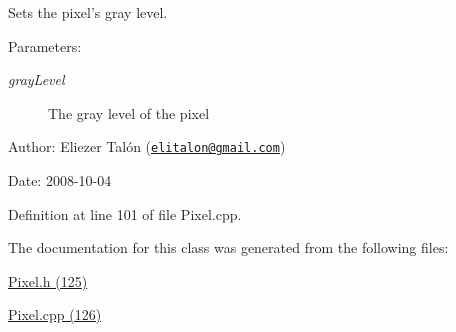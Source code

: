Sets the pixel's gray level. 

\begin{Desc}
\item[Parameters:]
\begin{description}
\item[{\em grayLevel}]The gray level of the pixel\end{description}
\end{Desc}
\begin{Desc}
\item[Author:]Eliezer Talón (\href{mailto:elitalon@gmail.com}{\tt elitalon@gmail.com}) \end{Desc}
\begin{Desc}
\item[Date:]2008-10-04 \end{Desc}


Definition at line 101 of file Pixel.cpp.

The documentation for this class was generated from the following files:\begin{CompactItemize}
\item 
\hyperlink{_pixel_8h}{Pixel.h (125)}\item 
\hyperlink{_pixel_8cpp}{Pixel.cpp (126)}\end{CompactItemize}
